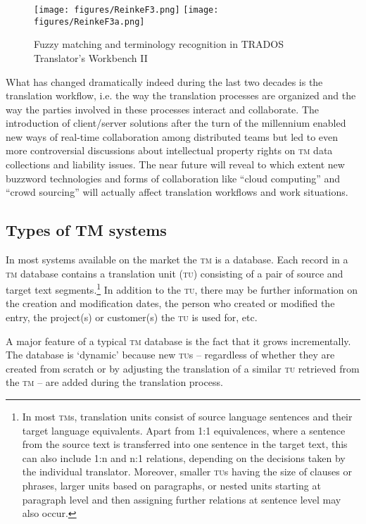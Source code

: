 \documentclass[output=paper]{LSP/langsci}
\begin{document}
\begin{figure}[h]
\texttt{[image: figures/ReinkeF3.png]}
\texttt{[image: figures/ReinkeF3a.png]}
\caption{Fuzzy matching and terminology recognition in TRADOS Translator's Workbench II}
\label{fig:reinke:3}
\end{figure}

What has changed dramatically indeed during the last two decades is the translation workflow, i.e. the way the translation processes are organized and the way the parties involved in these processes interact and collaborate. The introduction of client/server solutions after the turn of the millennium enabled new ways of real-time collaboration among distributed teams but led to even more controversial discussions about intellectual property rights on \textsc{tm} data collections and liability issues. The near future will reveal to which extent new buzzword technologies and forms of collaboration like ``cloud computing'' and ``crowd sourcing'' will actually affect translation workflows and work situations.

\subsection{Types of TM systems}\label{sec:reinke:2.3}

In most systems available on the market the \textsc{tm} is a database. Each record in a \textsc{tm} database contains a translation unit (\textsc{tu}) consisting of a pair of source and target text segments.\footnote{In most \textsc{tm}s, translation units consist of source language sentences and their target language equivalents. Apart from 1:1 equivalences, where a sentence from the source text is transferred into one sentence in the target text, this can also include 1:n and n:1 relations, depending on the decisions taken by the individual translator. Moreover, smaller \textsc{tu}s having the size of clauses or phrases, larger units based on paragraphs, or nested units starting at paragraph level and then assigning further relations at sentence level may also occur.} In addition to the \textsc{tu}, there may be further information on the creation and modification dates, the person who created or modified the entry, the project(s) or customer(s) the \textsc{tu} is used for, etc.

A major feature of a typical \textsc{tm} database is the fact that it grows incrementally. The database is `dynamic' because new \textsc{tu}s -- regardless of whether they are created from scratch or by adjusting the translation of a similar \textsc{tu} retrieved from the \textsc{tm} -- are added during the translation process. \largerpage
\end{document}
